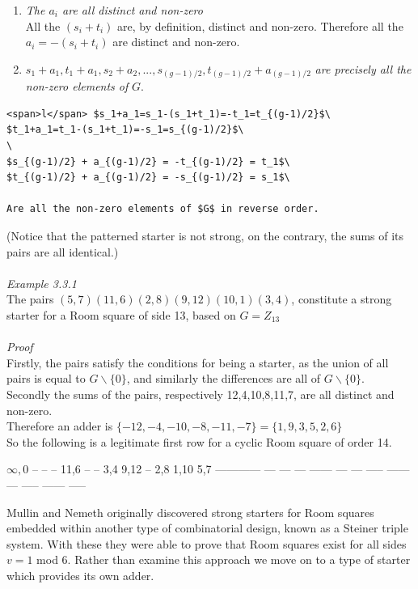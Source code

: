 \documentclass[
  12pt,
  a4paper]{book}
\begin{document}
\begin{enumerate}
\def\labelenumi{(\roman{enumi})}
\item
  \emph{The \(a_i\) are all distinct and non-zero}\\
  All the \((s_i+t_i)\) are, by definition, distinct and non-zero.
  Therefore all the \(a_i=-(s_i+t_i)\) are distinct and non-zero.
\item
  \(s_1 + a_1, t_1 + a_1, s_2 + a_2,..., s_{(g-1)/2}, t_{(g-1)/2}+a_{(g-1)/2}\)
  \emph{are precisely all the non-zero elements of} \(G\).
\end{enumerate}

\begin{verbatim}
<span>l</span> $s_1+a_1=s_1-(s_1+t_1)=-t_1=t_{(g-1)/2}$\
$t_1+a_1=t_1-(s_1+t_1)=-s_1=s_{(g-1)/2}$\
\
$s_{(g-1)/2} + a_{(g-1)/2} = -t_{(g-1)/2} = t_1$\
$t_{(g-1)/2} + a_{(g-1)/2} = -s_{(g-1)/2} = s_1$\

Are all the non-zero elements of $G$ in reverse order.
\end{verbatim}

(Notice that the patterned starter is not strong, on the contrary, the
sums of its pairs are all identical.)\\
~\\
\emph{Example 3.3.1}\\
The pairs \((5,7)(11,6)(2,8)(9,12)(10,1)(3,4)\), constitute a strong
starter for a Room square of side 13, based on \(G=Z_{13}\)\\
~\\
\emph{Proof}\\
Firstly, the pairs satisfy the conditions for being a starter, as the
union of all pairs is equal to \(G \backslash \{0\}\), and similarly the
differences are all of \(G\backslash \{0\}\).\\
Secondly the sums of the pairs, respectively 12,4,10,8,11,7, are all
distinct and non-zero.\\
Therefore an adder is \(\{-12,-4,-10,-8,-11,-7\}=\{1,9,3,5,2,6\}\)\\
So the following is a legitimate first row for a cyclic Room square of
order 14.

\(\infty,0\) -- -- -- 11,6 -- -- 3,4 9,12 -- 2,8 1,10 5,7
------------ --- --- --- ------ --- --- ----- ------ --- ----- ------ -----

Mullin and Nemeth originally discovered strong starters for Room squares
embedded within another type of combinatorial design, known as a Steiner
triple system. With these they were able to prove that Room squares
exist for all sides \(v=1\) mod 6. Rather than examine this approach we
move on to a type of starter which provides its own adder.
\end{document}
